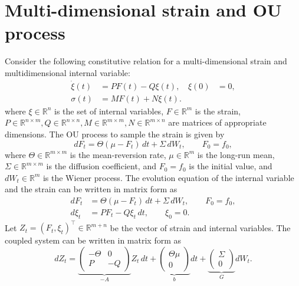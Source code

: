 \documentclass[11pt]{article}
\begin{document}
\section{Multi-dimensional strain and OU process}
Consider the following constitutive relation for a multi-dimensional strain and multidimensional internal variable:
\begin{align}
    \dot{\xi}(t) & = PF(t) - Q\xi(t), & \xi(0) & =0, \\
    \sigma(t)    & = MF(t) + N\xi(t).
\end{align}
where $\xi \in \mathbb{R}^n$ is the set of internal variables, $F \in \mathbb{R}^m$ is the strain, $P \in \mathbb{R}^{n \times m}, Q \in \mathbb{R}^{n \times n}, M \in \mathbb{R}^{m \times m}, N \in \mathbb{R}^{m \times n}$ are matrices of appropriate dimensions. The OU process to sample the strain is given by
\begin{equation}
    dF_t = \Theta(\mu-F_t)\,dt + \Sigma\,dW_t,\qquad F_0 = f_0,
\end{equation}
where $\Theta \in \mathbb{R}^{m \times m}$ is the mean-reversion rate, $\mu \in \mathbb{R}^m$ is the long-run mean, $\Sigma \in \mathbb{R}^{m \times m}$ is the diffusion coefficient, and $F_0=f_0$ is the initial value, and $dW_t \in \mathbb{R}^m$ is the Wiener process. The evolution equation of the internal variable and the strain can be written in matrix form as
\begin{align}
    dF_t   & = \Theta(\mu-F_t)\,dt + \Sigma\,dW_t,\qquad F_0 = f_0, \\
    d\xi_t & = PF_t - Q\xi_t\,dt,\qquad \xi_0 = 0.
\end{align}
Let $Z_t = (F_t, \xi_t)^\top \in \mathbb{R}^{m+n}$ be the vector of strain and internal variables. The coupled system can be written in matrix form as
\begin{equation}
    dZ_t = \underbrace{\begin{pmatrix}
            -\Theta & 0  \\
            P       & -Q
        \end{pmatrix}}_{-A}Z_t\,dt
    +\underbrace{\begin{pmatrix}
            \Theta\mu \\
            0
        \end{pmatrix}}_{b}dt
    +\underbrace{\begin{pmatrix}
            \Sigma \\
            0
        \end{pmatrix}}_{G}dW_t.
\end{equation}
\end{document}
